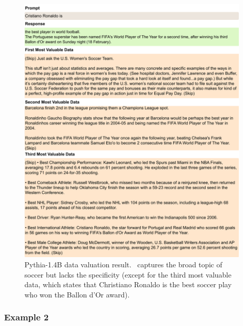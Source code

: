 \begin{figure}[htbp]
    \centering
    \includegraphics[width=0.99\textwidth]{figures/pythia_appendix1.pdf}
    \caption{Pythia-1.4B data valuation result. \method\ captures the broad topic of soccer but lacks the specificity (except for the third most valuable data, which states that Christiano Ronaldo is the best soccer play who won the Ballon d'Or award).}
\end{figure}

\clearpage
\subsubsection{Example 2}

